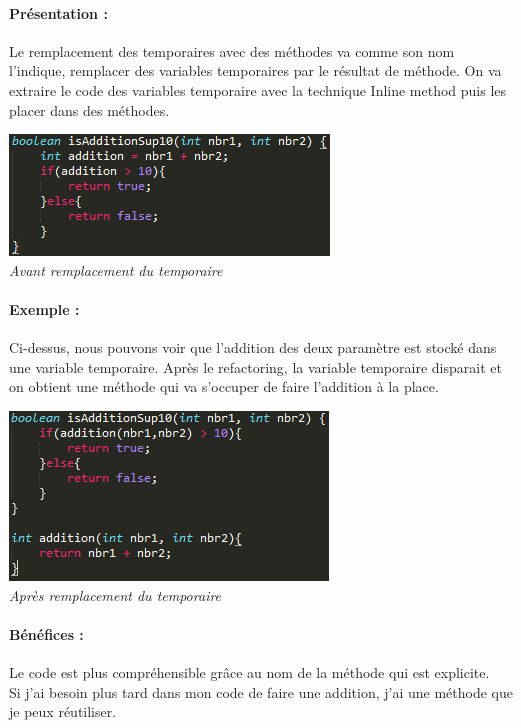 \documentclass[a4paper,twoside,12pt,openright]{report}
\begin{document}
\paragraph{Présentation :}
Le remplacement des temporaires avec des méthodes va comme son nom l'indique, remplacer des variables temporaires par le résultat de méthode. On va extraire le code des variables temporaire avec la technique Inline method puis les placer dans des méthodes.

\begin{center}
\includegraphics[scale=1]{Image/Remplacement_Temp_Methode.png}\\
\itshape{Avant remplacement du temporaire}
\end{center}

\paragraph{Exemple :}
Ci-dessus, nous pouvons voir que l'addition des deux paramètre est stocké dans une variable temporaire. Après le refactoring, la variable temporaire disparait et on obtient une méthode qui va s'occuper de faire l'addition à la place.

\begin{center}
\includegraphics[scale=1]{Image/Remplacement_Temp_Methode2.png}\\
\itshape{Après remplacement du temporaire}
\end{center}

\paragraph{Bénéfices :}
Le code est plus compréhensible grâce au nom de la méthode qui est explicite.\\
Si j'ai besoin plus tard dans mon code de faire une addition, j'ai une méthode que je peux réutiliser.\\
\end{document}
